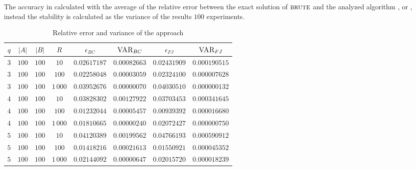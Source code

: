 	The accuracy in calculated with the average of the relative error between the exact solution of $\textsc{brute}$ and the analyzed algorithm \fcount, \fsamp or \base, instead the stability is calculated as the variance of the results $100$ experiments.

	\begin{table}[h]
		\centering
		\begin{tabular}{|c|c|c|c|c|c|c|c|}
			\hline
			$q$ & $|A|$ & $|B|$ & $R$      & $\epsilon_{BC}$ & $\textsc{VAR}_{BC}$ & $\epsilon_{FJ}$ & $\textsc{VAR}_{FJ}$ \\ \hline \hline
			$3$ & $100$ & $100$ & $10$     & $0.02617187$ & $0.00082663$ & $0.02431909$ & $0.000190515$ \\ \hline
			$3$ & $100$ & $100$ & $100$    & $0.02258048$ & $0.00003059$ & $0.02324100$ & $0.000007628$ \\ \hline
			$3$ & $100$ & $100$ & $1\,000$ & $0.03952676$ & $0.00000070$ & $0.04030510$ & $0.000000132$ \\ \hline \hline
			$4$ & $100$ & $100$ & $10$     & $0.03828302$ & $0.00127922$ & $0.03703453$ & $0.000341645$ \\ \hline
			$4$ & $100$ & $100$ & $100$    & $0.01232044$ & $0.00005457$ & $0.00939392$ & $0.000016680$ \\ \hline
			$4$ & $100$ & $100$ & $1\,000$ & $0.01810665$ & $0.00000240$ & $0.02072427$ & $0.000000750$ \\ \hline \hline
			$5$ & $100$ & $100$ & $10$     & $0.04120389$ & $0.00199562$ & $0.04766193$ & $0.000590912$ \\ \hline
			$5$ & $100$ & $100$ & $100$    & $0.01418216$ & $0.00021613$ & $0.01550921$ & $0.000045352$ \\ \hline
			$5$ & $100$ & $100$ & $1\,000$ & $0.02144092$ & $0.00000647$ & $0.02015720$ & $0.000018239$ \\ \hline
			
		\end{tabular}
		\caption{Relative error and variance of the \fcount approach}	
	\end{table}

